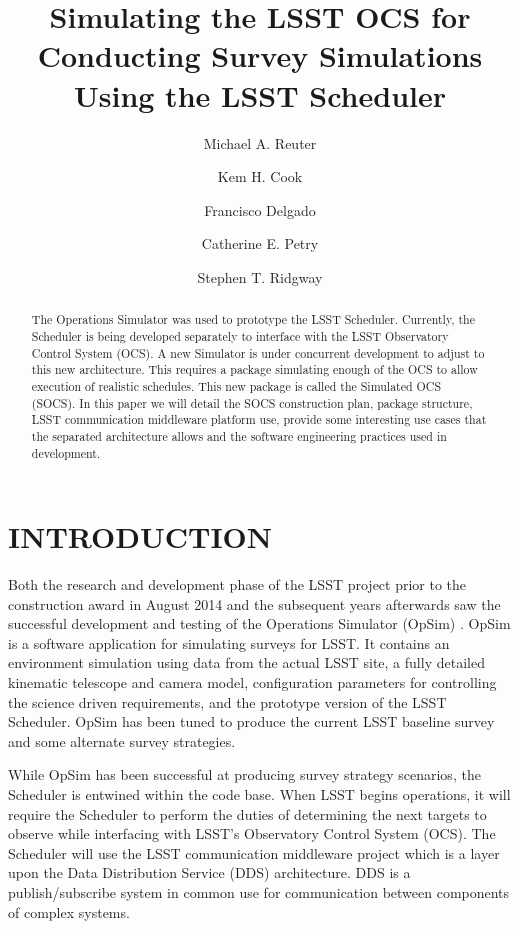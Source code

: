 \documentclass[]{spie}  %
\title{Simulating the LSST OCS for Conducting Survey Simulations Using the LSST Scheduler}
\author[a]{Michael A. Reuter}
\author[b]{Kem H. Cook}
\author[a]{Francisco Delgado}
\author[a]{Catherine E. Petry}
\author[c]{Stephen T. Ridgway}
\affil[a]{LSST, 950 N Cherry Ave, Tucson, AZ USA}
\affil[b]{Cook Astronomical Consulting, San Ramon, CA USA}
\affil[c]{National Optical Astronomy Observatory, 950 N Cherry Ave, Tucson, AZ USA}
\begin{document}
 
\maketitle

\begin{abstract}
The Operations Simulator was used to prototype the LSST Scheduler. Currently, the Scheduler is being developed separately to interface with the LSST Observatory Control System (OCS). A new Simulator is under concurrent development to adjust to this new architecture. This requires a package simulating enough of the OCS to allow execution of realistic schedules. This new package is called the Simulated OCS (SOCS). In this paper we will detail the SOCS construction plan, package structure, LSST communication middleware platform use, provide some interesting use cases that the separated architecture allows and the software engineering practices used in development.
\end{abstract}


\section{INTRODUCTION}
\label{sec:intro}  %

Both the research and development phase of the LSST project prior to the construction award in August 2014 and the subsequent years afterwards saw the successful development and testing of the Operations Simulator (OpSim) \cite{2014SPIE.9149E..0GD}\cite{2014SPIE.9150E..15D}\cite{2013AAS...22124703S}\cite{2010SPIE.7737E..0ZR}\cite{2010AAS...21540105K}\cite{2009AAS...21346004C}\cite{2007AAS...21113703P}\cite{2006SPIE.6270E..1DD}\cite{2006AAS...209.8604P}\cite{2005AAS...207.2626C}\cite{2004AAS...20510809C} . OpSim is a software application for simulating surveys for LSST. It contains an environment simulation using data from the actual LSST site, a fully detailed kinematic telescope and camera model, configuration parameters for controlling the science driven requirements, and the prototype version of the LSST Scheduler. OpSim has been tuned to produce the current LSST baseline survey and some alternate survey strategies\cite{Cook_SPIE2016}. 

While OpSim has been successful at producing survey strategy scenarios, the Scheduler is entwined within the code base. When LSST begins operations, it will require the Scheduler to perform the duties of determining the next targets to observe while interfacing with LSST's Observatory Control System (OCS)\cite{Daly_SPIE2016}. The Scheduler will use the LSST communication middleware\cite{Mills_SPIE2016} project which is a layer upon the Data Distribution Service (DDS) architecture. DDS is a publish/subscribe system in common use for communication between components of complex systems. 
\end{document}
